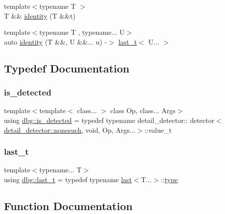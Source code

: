 \begin{DoxyCompactItemize}
\item 
{\footnotesize template$<$typename T $>$ }\\T \&\& \hyperlink{namespacedbg_a23f10decf1edf2d34e226437e5562452}{identity} (T \&\&t)
\item 
{\footnotesize template$<$typename T , typename... U$>$ }\\auto \hyperlink{namespacedbg_a2f87ce2acfce330c46dba7f4c62c2fb8}{identity} (T \&\&, U \&\&... u) -\/$>$ \hyperlink{namespacedbg_a4754c7365d6eb31696a4613230e21ac4}{last\+\_\+t}$<$ U... $>$
\end{DoxyCompactItemize}


\subsection{Typedef Documentation}
\mbox{\label{namespacedbg_a4fff29dc9282f3e887a7c1290477708c}} 
\subsubsection{\texorpdfstring{is\+\_\+detected}{is\_detected}}
{\footnotesize\ttfamily template$<$template$<$ class... $>$ class Op, class... Args$>$ \\
using \hyperlink{namespacedbg_a4fff29dc9282f3e887a7c1290477708c}{dbg\+::is\+\_\+detected} = typedef typename detail\+\_\+detector\+:: detector$<$\hyperlink{structdbg_1_1detail__detector_1_1nonesuch}{detail\+\_\+detector\+::nonesuch}, void, Op, Args...$>$\+::value\+\_\+t}

\mbox{\label{namespacedbg_a4754c7365d6eb31696a4613230e21ac4}} 
\subsubsection{\texorpdfstring{last\+\_\+t}{last\_t}}
{\footnotesize\ttfamily template$<$typename... T$>$ \\
using \hyperlink{namespacedbg_a4754c7365d6eb31696a4613230e21ac4}{dbg\+::last\+\_\+t} = typedef typename \hyperlink{structdbg_1_1last}{last}$<$T...$>$\+::\hyperlink{namespacedbg_a2365d80e3a3525e6025040383ff8661b}{type}}



\subsection{Function Documentation}
\mbox{\label{namespacedbg_a554c31997738273466a9f1fd426a3369}} 
